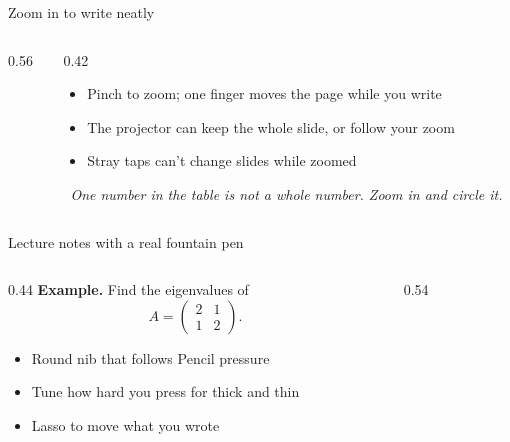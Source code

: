 \documentclass[aspectratio=169,11pt]{beamer}
\newcommand{\feature}[2]{\item[\textcolor{pcViolet}{#1}] #2}
\newcommand{\tryit}[1]{\par\vfill{\small\textcolor{pcViolet}{\faHandPointRight[regular]}\ \textit{#1}}}
\begin{document}
\begin{frame}{Zoom in to write neatly}
  \begin{columns}[c]
    \begin{column}{0.56\textwidth}
      \centering
    \end{column}
    \begin{column}{0.42\textwidth}
      \begin{itemize}
        \feature{\faSearchPlus}{Pinch to zoom; one finger moves the page while you write}
        \feature{\faTv}{The projector can keep the whole slide, or follow your zoom}
        \feature{\faHandPaper[regular]}{Stray taps can't change slides while zoomed}
      \end{itemize}
      \tryit{One number in the table is not a whole number. Zoom in and circle it.}
    \end{column}
  \end{columns}
\end{frame}

\begin{frame}{Lecture notes with a real fountain pen}
  \begin{columns}[t]
    \begin{column}{0.44\textwidth}
      \textbf{Example.} Find the eigenvalues of
      \[ A = \begin{pmatrix} 2 & 1\\ 1 & 2 \end{pmatrix}. \]
      \vspace{-0.5em}
      \begin{itemize}
        \feature{\faPenNib}{Round nib that follows Pencil pressure}
        \feature{\faSlidersH}{Tune how hard you press for thick and thin}
        \feature{\faDrawPolygon}{Lasso to move what you wrote}
      \end{itemize}
    \end{column}
    \begin{column}{0.54\textwidth}
    \end{column}
  \end{columns}
\end{frame}
\end{document}
